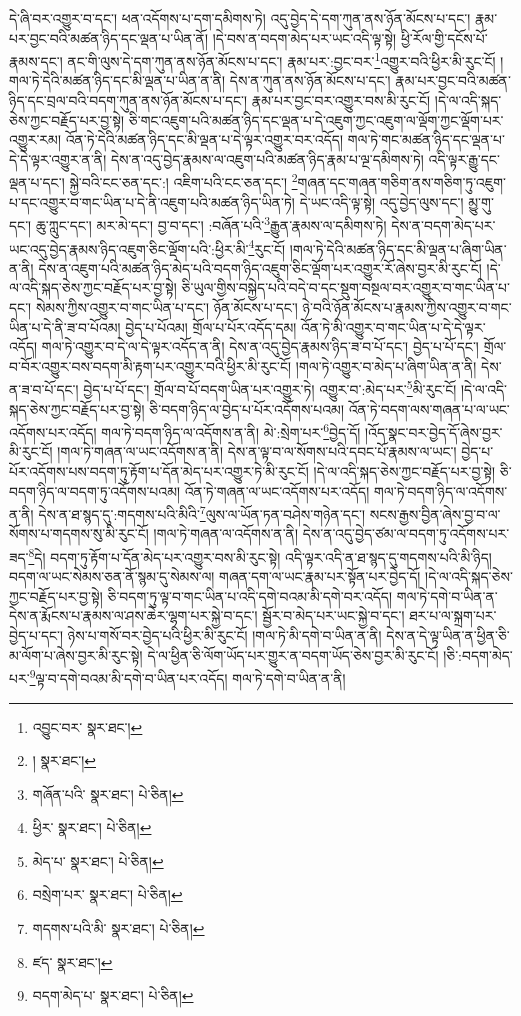 དེ་ཞི་བར་འགྱུར་བ་དང་། ཕན་འདོགས་པ་དག་དམིགས་ཏེ། འདུ་བྱེད་དེ་དག་ཀུན་ནས་ཉོན་མོངས་པ་དང་། རྣམ་པར་བྱང་བའི་མཚན་ཉིད་དང་ལྡན་པ་ཡིན་ནོ། །དེ་བས་ན་བདག་མེད་པར་ཡང་འདི་ལྟ་སྟེ། ཕྱི་རོལ་གྱི་དངོས་པོ་རྣམས་དང་། ནང་གི་ལུས་དེ་དག་ཀུན་ནས་ཉོན་མོངས་པ་དང་། རྣམ་པར་:བྱང་བར་\footnote{འབྱུང་བར་  སྣར་ཐང་། }འགྱུར་བའི་ཕྱིར་མི་རུང་ངོ། །གལ་ཏེ་དེའི་མཚན་ཉིད་དང་མི་ལྡན་པ་ཡིན་ན་ནི། དེས་ན་ཀུན་ནས་ཉོན་མོངས་པ་དང་། རྣམ་པར་བྱང་བའི་མཚན་ཉིད་དང་བྲལ་བའི་བདག་ཀུན་ནས་ཉོན་མོངས་པ་དང་། རྣམ་པར་བྱང་བར་འགྱུར་བས་མི་རུང་ངོ། །དེ་ལ་འདི་སྐད་ཅེས་ཀྱང་བརྗོད་པར་བྱ་སྟེ། ཅི་གང་འཇུག་པའི་མཚན་ཉིད་དང་ལྡན་པ་དེ་འཇུག་ཀྱང་འཇུག་ལ་ལྡོག་ཀྱང་ལྡོག་པར་འགྱུར་རམ། འོན་ཏེ་དེའི་མཚན་ཉིད་དང་མི་ལྡན་པ་དེ་ལྟར་འགྱུར་བར་འདོད། གལ་ཏེ་གང་མཚན་ཉིད་དང་ལྡན་པ་དེ་དེ་ལྟར་འགྱུར་ན་ནི། དེས་ན་འདུ་བྱེད་རྣམས་ལ་འཇུག་པའི་མཚན་ཉིད་རྣམ་པ་ལྔ་དམིགས་ཏེ། འདི་ལྟར་རྒྱུ་དང་ལྡན་པ་དང་། སྐྱེ་བའི་ངང་ཅན་དང་:། འཇིག་པའི་ངང་ཅན་དང་། \footnote{།    སྣར་ཐང་། }གཞན་དང་གཞན་གཅིག་ནས་གཅིག་ཏུ་འཇུག་པ་དང་འགྱུར་བ་གང་ཡིན་པ་དེ་ནི་འཇུག་པའི་མཚན་ཉིད་ཡིན་ཏེ། དེ་ཡང་འདི་ལྟ་སྟེ། འདུ་བྱེད་ལུས་དང་། མྱུ་གུ་དང་། ཆུ་ཀླུང་དང་། མར་མེ་དང་། བྱ་བ་དང་། :བཞོན་པའི་\footnote{གཞོན་པའི་  སྣར་ཐང་།  པེ་ཅིན། }རྒྱུན་རྣམས་ལ་དམིགས་ཏེ། དེས་ན་བདག་མེད་པར་ཡང་འདུ་བྱེད་རྣམས་ཉིད་འཇུག་ཅིང་ལྡོག་པའི་:ཕྱིར་མི་\footnote{ཕྱིར་  སྣར་ཐང་།  པེ་ཅིན། }རུང་ངོ། །གལ་ཏེ་དེའི་མཚན་ཉིད་དང་མི་ལྡན་པ་ཞིག་ཡིན་ན་ནི། དེས་ན་འཇུག་པའི་མཚན་ཉིད་མེད་པའི་བདག་ཉིད་འཇུག་ཅིང་ལྡོག་པར་འགྱུར་རོ་ཞེས་བྱར་མི་རུང་ངོ། །དེ་ལ་འདི་སྐད་ཅེས་ཀྱང་བརྗོད་པར་བྱ་སྟེ། ཅི་ཡུལ་གྱིས་བསྐྱེད་པའི་བདེ་བ་དང་སྡུག་བསྔལ་བར་འགྱུར་བ་གང་ཡིན་པ་དང་། སེམས་ཀྱིས་འགྱུར་བ་གང་ཡིན་པ་དང་། ཉོན་མོངས་པ་དང་། ཉེ་བའི་ཉོན་མོངས་པ་རྣམས་ཀྱིས་འགྱུར་བ་གང་ཡིན་པ་དེ་ནི་ཟ་བ་པོའམ། བྱེད་པ་པོའམ། གྲོལ་པ་པོར་འདོད་དམ། འོན་ཏེ་མི་འགྱུར་བ་གང་ཡིན་པ་དེ་དེ་ལྟར་འདོད། གལ་ཏེ་འགྱུར་བ་དེ་ལ་དེ་ལྟར་འདོད་ན་ནི། དེས་ན་འདུ་བྱེད་རྣམས་ཉིད་ཟ་བ་པོ་དང་། བྱེད་པ་པོ་དང་། གྲོལ་བ་བོར་འགྱུར་བས་བདག་མི་རྟག་པར་འགྱུར་བའི་ཕྱིར་མི་རུང་ངོ། །གལ་ཏེ་འགྱུར་བ་མེད་པ་ཞིག་ཡིན་ན་ནི། དེས་ན་ཟ་བ་པོ་དང་། བྱེད་པ་པོ་དང་། གྲོལ་བ་པོ་བདག་ཡིན་པར་འགྱུར་ཏེ། འགྱུར་བ་:མེད་པར་\footnote{མེད་པ་  སྣར་ཐང་།  པེ་ཅིན། }མི་རུང་ངོ། །དེ་ལ་འདི་སྐད་ཅེས་ཀྱང་བརྗོད་པར་བྱ་སྟེ། ཅི་བདག་ཉིད་ལ་བྱེད་པ་པོར་འདོགས་པའམ། འོན་ཏེ་བདག་ལས་གཞན་པ་ལ་ཡང་འདོགས་པར་འདོད། གལ་ཏེ་བདག་ཉིད་ལ་འདོགས་ན་ནི། མེ་:སྲེག་པར་\footnote{བསྲེག་པར་  སྣར་ཐང་།  པེ་ཅིན། }བྱེད་དོ། །འོད་སྣང་བར་བྱེད་དོ་ཞེས་བྱར་མི་རུང་ངོ། །གལ་ཏེ་གཞན་ལ་ཡང་འདོགས་ན་ནི། དེས་ན་ལྟ་བ་ལ་སོགས་པའི་དབང་པོ་རྣམས་ལ་ཡང་། བྱེད་པ་པོར་འདོགས་པས་བདག་ཏུ་རྟོག་པ་དོན་མེད་པར་འགྱུར་ཏེ་མི་རུང་ངོ། །དེ་ལ་འདི་སྐད་ཅེས་ཀྱང་བརྗོད་པར་བྱ་སྟེ། ཅི་བདག་ཉིད་ལ་བདག་ཏུ་འདོགས་པའམ། འོན་ཏེ་གཞན་ལ་ཡང་འདོགས་པར་འདོད། གལ་ཏེ་བདག་ཉིད་ལ་འདོགས་ན་ནི། དེས་ན་ཐ་སྙད་དུ་:གདགས་པའི་མིའི་\footnote{གདགས་པའི་མི་  སྣར་ཐང་།  པེ་ཅིན། }ལུས་ལ་ཡོན་ཏན་བཤེས་གཉེན་དང་། སངས་རྒྱས་བྱིན་ཞེས་བྱ་བ་ལ་སོགས་པ་གདགས་སུ་མི་རུང་ངོ། །གལ་ཏེ་གཞན་ལ་འདོགས་ན་ནི། དེས་ན་འདུ་བྱེད་ཙམ་ལ་བདག་ཏུ་འདོགས་པར་ཟད་\footnote{ཛད་  སྣར་ཐང་། }དེ། བདག་ཏུ་རྟོག་པ་དོན་མེད་པར་འགྱུར་བས་མི་རུང་སྟེ། འདི་ལྟར་འདི་ན་ཐ་སྙད་དུ་གདགས་པའི་མི་ཉིད། བདག་ལ་ཡང་སེམས་ཅན་ནོ་སྙམ་དུ་སེམས་ལ། གཞན་དག་ལ་ཡང་རྣམ་པར་སྟོན་པར་བྱེད་དོ། །དེ་ལ་འདི་སྐད་ཅེས་ཀྱང་བརྗོད་པར་བྱ་སྟེ། ཅི་བདག་ཏུ་ལྟ་བ་གང་ཡིན་པ་འདི་དགེ་བའམ་མི་དགེ་བར་འདོད། གལ་ཏེ་དགེ་བ་ཡིན་ན་དེས་ན་རྨོངས་པ་རྣམས་ལ་ཤས་ཆེར་ལྷག་པར་སྐྱེ་བ་དང་། སྦྱོར་བ་མེད་པར་ཡང་སྐྱེ་བ་དང་། ཐར་པ་ལ་སྐྲག་པར་བྱེད་པ་དང་། ཉེས་པ་གསོ་བར་བྱེད་པའི་ཕྱིར་མི་རུང་ངོ། །གལ་ཏེ་མི་དགེ་བ་ཡིན་ན་ནི། དེས་ན་དེ་ལྟ་ཡིན་ན་ཕྱིན་ཅི་མ་ལོག་པ་ཞེས་བྱར་མི་རུང་སྟེ། དེ་ལ་ཕྱིན་ཅི་ལོག་ཡོད་པར་གྱུར་ན་བདག་ཡོད་ཅེས་བྱར་མི་རུང་ངོ། །ཅི་:བདག་མེད་པར་\footnote{བདག་མེད་པ་  སྣར་ཐང་།  པེ་ཅིན། }ལྟ་བ་དགེ་བའམ་མི་དགེ་བ་ཡིན་པར་འདོད། གལ་ཏེ་དགེ་བ་ཡིན་ན་ནི། 